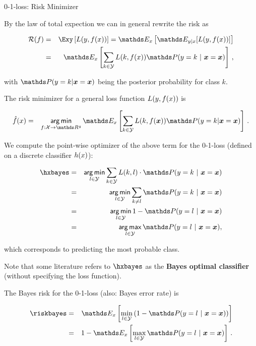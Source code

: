 \begin{vbframe}{0-1-loss: Risk Minimizer}

By the law of total expection we can in general rewrite the risk as

\vspace*{-0.5cm}

\begin{eqnarray*}
  \riskf  & = & \Exy\left[\Lxy\right] = \E_x \left[ \E_{y|x} [ L(y, \fx) ] \right] \\
          & = & \E_x \left[\sum_{k \in \Yspace} L(k, \fx) \P(y = k~|~ \xv = \xv)\right]\,, 
\end{eqnarray*}

with $\P(y = k| \xv = \xv)$ being the posterior probability for class $k$.

\lz 

The risk minimizer for a general loss function $L(y, f(x))$ is

\begin{eqnarray*}
  \fxh &=& \argmin_{f: \Xspace \to \R^g} \E_x \left[\sum_{k \in \Yspace} L(k, f(\bm{x})) \P(y = k| \xv = \xv)\right]\,.  \\
\end{eqnarray*}


\framebreak 

We compute the point-wise optimizer of the above term for the 0-1-loss (defined on a discrete classifier $h(x)$): 

  \begin{eqnarray*}  
  \hxbayes &=& \argmin_{l \in \Yspace} \sum_{k \in \Yspace} L(k, l) \cdot \P(y = k~|~\xv = \xv) \\
  &=& \argmin_{l \in \Yspace} \sum_{k \ne l} \P(y = k~|~\xv = \xv) \\ 
  &=& \argmin_{l \in \Yspace} 1 - \P(y = l~|~\xv = \xv) \\
  &=& \argmax_{l \in \Yspace} \P(y = l~|~ \xv = \xv),
  \end{eqnarray*}

which corresponds to predicting the most probable class. 

\lz 

Note that some literature refers to $\hxbayes$ as the \textbf{Bayes optimal classifier} (without specifying the loss function). 

\lz 

The Bayes risk for the 0-1-loss (also: Bayes error rate) is 

\begin{eqnarray*}  
  \riskbayes &=& \E_x\left[\min_{l \in \Yspace} \left(1 - \P(y = l ~|~ \xv = \xv)\right)\right] \\
             &=& 1 - \E_x \left[\max_{l \in \Yspace} \P(y = l~|~ \xv = \xv)\right]\,.
\end{eqnarray*}


\end{vbframe}
